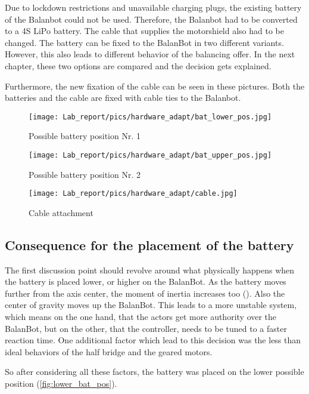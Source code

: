Due to lockdown restrictions and unavailable charging plugs, the existing battery of the Balanbot could not be used. Therefore, the Balanbot had to be converted to a 4S LiPo battery. The cable that supplies the motorshield also had to be changed. The battery can be fixed to the BalanBot in two different variants. However, this also leads to different behavior of the balancing offer. In the next chapter, these two options are compared and the decision gets explained.

Furthermore, the new fixation of the cable can be seen in these pictures. Both the batteries and the cable are fixed with cable ties to the Balanbot.
\begin{figure}[H]
    \centering
    \texttt{[image: Lab\_report/pics/hardware\_adapt/bat\_lower\_pos.jpg]}
    \caption{Possible battery position Nr. 1}
    \label{fig:lower_bat_pos}
\end{figure}

\begin{figure}[H]
    \centering
    \texttt{[image: Lab\_report/pics/hardware\_adapt/bat\_upper\_pos.jpg]}
    \caption{Possible battery position Nr. 2 }
    \label{fig:upperlower_bat_pos}
\end{figure}

\begin{figure}[H]
    \centering
    \texttt{[image: Lab\_report/pics/hardware\_adapt/cable.jpg]}
    \caption{Cable attachment}
    \label{fig:cable}
\end{figure}

\subsection{Consequence for the placement of the battery}
The first discussion point should revolve around what physically happens when the battery is placed lower, or higher on the BalanBot. As the battery moves further from the axis center, the moment of inertia increases too (\cite{enwiki:satz_von_steiner}). Also the center of gravity moves up the BalanBot. This leads to a more unstable system, which means on the one hand, that the actors get more authority over the BalanBot, but on the other, that the controller, needs to be tuned to a faster reaction time. One additional factor which lead to this decision was the less than ideal behaviors of the half bridge and the geared motors. 

So after considering all these factors, the battery was placed on the lower possible position (\autoref{fig:lower_bat_pos}).
